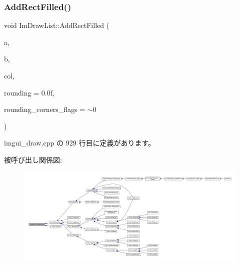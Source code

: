 \subsubsection{\texorpdfstring{Add\+Rect\+Filled()}{AddRectFilled()}}
{\footnotesize\ttfamily void Im\+Draw\+List\+::\+Add\+Rect\+Filled (\begin{DoxyParamCaption}\item[{const \mbox{\hyperlink{struct_im_vec2}{Im\+Vec2}} \&}]{a,  }\item[{const \mbox{\hyperlink{struct_im_vec2}{Im\+Vec2}} \&}]{b,  }\item[{\mbox{\hyperlink{imgui_8h_a118cff4eeb8d00e7d07ce3d6460eed36}{Im\+U32}}}]{col,  }\item[{float}]{rounding = {\ttfamily 0.0f},  }\item[{int}]{rounding\+\_\+corners\+\_\+flags = {\ttfamily $\sim$0} }\end{DoxyParamCaption})}



 imgui\+\_\+draw.\+cpp の 929 行目に定義があります。

被呼び出し関係図\+:
\nopagebreak
\begin{figure}[H]
\begin{center}
\leavevmode
\includegraphics[width=350pt]{struct_im_draw_list_a1fa7c9165958909bba53c9740a607872_icgraph}
\end{center}
\end{figure}
\mbox{\label{struct_im_draw_list_ab658e574f3ef67a8d6cc0a86f13f5176}} 
